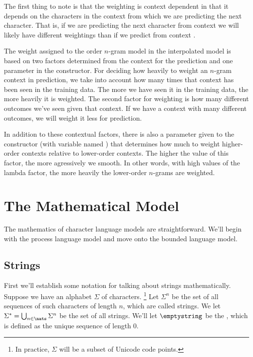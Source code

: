 The first thing to note is that the weighting is context dependent in
that it depends on the characters in the context from which we are
predicting the next character.  That is, if we are predicting the next
character from context  we will likely have
different weightings than if we predict from context .

The weight assigned to the order $n$-gram model in the interpolated
model is based on two factors determined from the context for the
prediction and one parameter in the constructor.  For deciding how
heavily to weight an $n$-gram context in prediction, we take into
account how many times that context has been seen in the training
data.  The more we have seen it in the training data, the more heavily
it is weighted.  The second factor for weighting is how many different
outcomes we've seen given that context.  If we have a context with
many different outcomes, we will weight it less for prediction.  

In addition to these contextual factors, there is also a parameter
given to the constructor (with variable named )
that determines how much to weight higher-order contexts relative to
lower-order contexts.  The higher the value of this factor, the more
agressively we smooth.  In other words, with high values of the lambda
factor, the more heavily the lower-order $n$-grams are weighted.


\section{The Mathematical Model}\label{section{char-lm-math}}

The mathematics of character language models are straightforward.
We'll begin with the process language model and move onto the
bounded language model.

\subsection{Strings}

First we'll establish some notation for talking about strings
mathematically.  Suppose we have an alphabet $\Sigma$ of characters.%
%
\footnote{In practice, $\Sigma$ will be a subset of Unicode code
  points.}
%
Let $\Sigma^n$ be the set of all sequences of such characters of
length $n$, which are called strings.  We let $\Sigma^* = \bigcup_{n
  \in \nats} \Sigma^n$ be the set of all strings.  We'll let
$\emptystring$ be the , which is defined as the
unique sequence of length 0.


